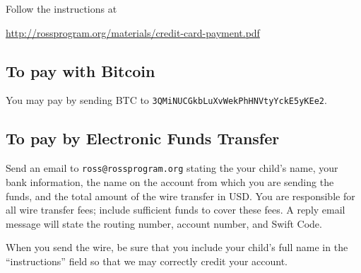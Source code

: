 \documentclass[11pt]{ross}
\begin{document}
Follow the instructions at
\begin{center}
\url{http://rossprogram.org/materials/credit-card-payment.pdf}
\end{center}

\subsection*{To pay with Bitcoin}

You may pay by sending BTC to \texttt{3QMiNUCGkbLuXvWekPhHNVtyYckE5yKEe2}.

\subsection*{To pay by Electronic Funds Transfer}

Send an email to \texttt{ross@rossprogram.org} stating the your
child's name, your bank information, the name on the account from
which you are sending the funds, and the total amount of the wire
transfer in USD. You are responsible for all wire transfer fees;
include sufficient funds to cover these fees.  A reply email message
will state the routing number, account number, and Swift Code.

When you send the wire, be sure that you include your child's full
name in the ``instructions'' field so that we may correctly credit
your account.
\end{document}
